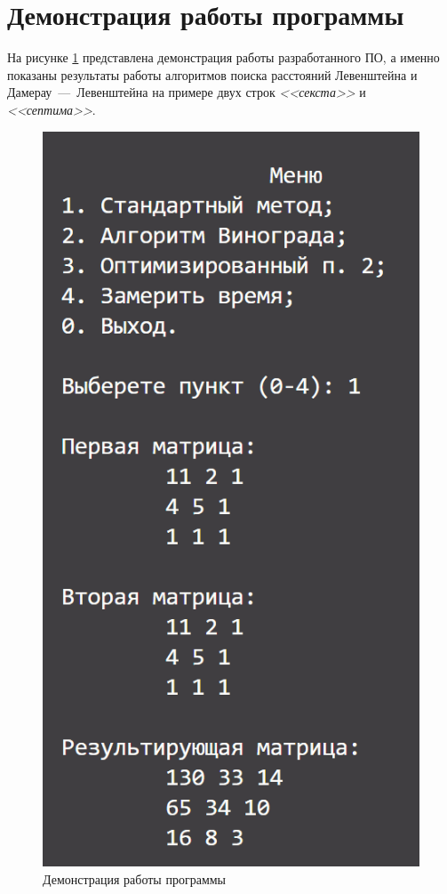 \section{Демонстрация работы программы}
На рисунке \ref{img:demonstration} представлена демонстрация работы разработанного ПО, а именно показаны результаты работы алгоритмов поиска расстояний Левенштейна и Дамерау~---~Левенштейна на примере двух строк \textit{<<секста>>} и \textit{<<септима>>}.  
\clearpage
\begin{figure}[h]
	\centering
	\includegraphics[height=0.7\textheight]{img/prog_work.png}
	\caption{Демонстрация работы программы}
	\label{img:demonstration}
\end{figure}


